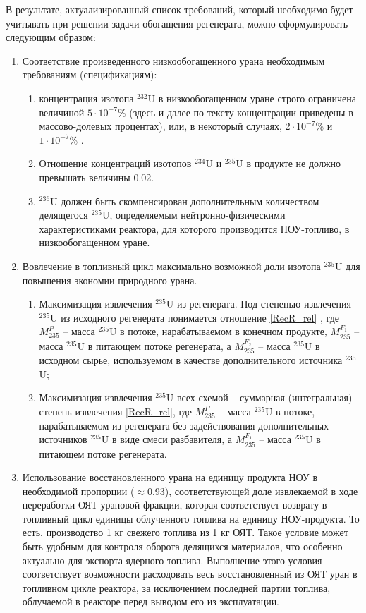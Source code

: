 В результате, актуализированный список требований, который необходимо будет учитывать при решении задачи обогащения регенерата, можно сформулировать следующим образом:
\begin{enumerate}
  \item Соответствие произведенного низкообогащенного урана необходимым требованиям (спецификациям):
  \begin{enumerate}
    \item концентрация изотопа $^{232}$U в низкообогащенном уране строго ограничена величиной $5\cdot10^{-7}$\% (здесь и далее по тексту концентрации приведены в массово-долевых процентах), или, в некоторый случаях, $2\cdot10^{-7}$\% и $1\cdot10^{-7}$\% \cite{smirnovKaskadnyeShemyZadachah2012, c26committeeSpecificationUraniumHexafluoride}.
    \item Отношение концентраций изотопов $^{234}$U и $^{235}$U в продукте не должно превышать величины 0.02.
    \item $^{236}$U должен быть скомпенсирован дополнительным количеством делящегося $^{235}$U, определяемым нейтронно-физическими характеристиками реактора, для которого производится НОУ-топливо, в низкообогащенном уране.
  \end{enumerate}
  \item Вовлечение в топливный цикл максимально возможной доли изотопа $^{235}$U для повышения экономии природного урана.
  \begin{enumerate}
    \item Максимизация извлечения $^{235}$U из регенерата. Под степенью извлечения $^{235}$U из исходного регенерата понимается отношение \ref{RecR_rel} , где $M_{235}^{P}$ -- масса $^{235}$U в потоке, нарабатываемом в конечном продукте, $M_{235}^{F_{1}}$  -- масса $^{235}$U в питающем потоке регенерата, а $M_{235}^{F_{2}}$ -- масса $^{235}$U в исходном сырье, используемом в качестве дополнительного источника $^{235}$U;
    \item Максимизация извлечения $^{235}$U всех схемой -- суммарная (интегральная) степень извлечения \ref{RecR_rel}, где $M_{235}^{P}$ -- масса $^{235}$U в потоке, нарабатываемом из регенерата без задействования дополнительных источников $^{235}$U в виде смеси разбавителя, а $M_{235}^{F_{1}}$ -- масса $^{235}$U в питающем потоке регенерата.
  \end{enumerate}
  \item Использование восстановленного урана на единицу продукта НОУ в необходимой пропорции ($\approx$0,93), соответствующей доле извлекаемой в ходе переработки ОЯТ урановой фракции, которая соответствует возврату в топливный цикл единицы облученного топлива на единицу НОУ-продукта. То есть, производство 1 кг свежего топлива из 1 кг ОЯТ. Такое условие может быть удобным для контроля оборота делящихся материалов, что особенно актуально для экспорта ядерного топлива. Выполнение этого условия соответствует возможности расходовать весь восстановленный из ОЯТ уран в топливном цикле реактора, за исключением последней партии топлива, облучаемой в реакторе перед выводом его из эксплуатации.
\end{enumerate}

